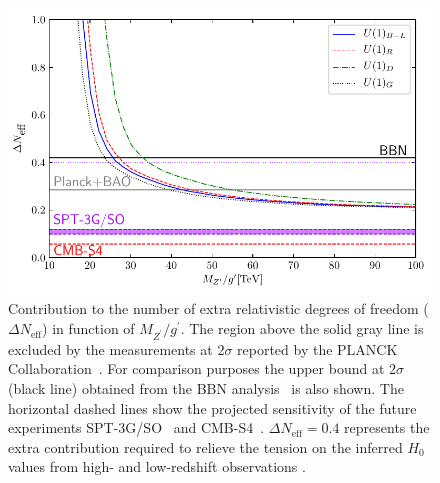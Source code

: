 \documentclass[12pt]{article}
\begin{document}
%
\begin{figure}[t]
\centering
\includegraphics[scale=1]{D_Neff.pdf}
\caption{Contribution to the number of extra relativistic degrees of freedom ($\Delta N_{\text{eff}}$) in function of $M_{Z^{\prime}}/g^{\prime}$. The region above the solid gray line is excluded by the measurements at $2\sigma$ reported by the PLANCK Collaboration~\cite{Aghanim:2018eyx}. For comparison purposes  the upper bound at $2\sigma$ (black line) obtained from the BBN analysis~\cite{Pitrou:2018cgg} is also shown.  The horizontal dashed lines show the projected sensitivity of the future experiments SPT-3G/SO~\cite{Benson:2014qhw} and CMB-S4~\cite{Abitbol:2019nhf}. $\Delta N_{\text{eff}}=0.4$ represents the extra contribution  required to relieve the tension on the inferred $H_0$ values from  high- and low-redshift observations \cite{Bernal:2016gxb,Mortsell:2018mfj}. }
\label{fig:Neff}
\end{figure}
%
\end{document}
